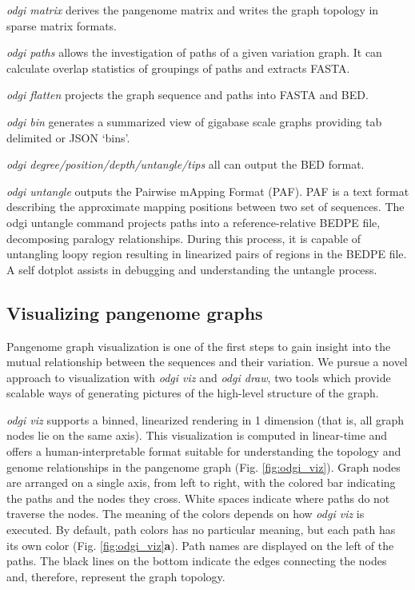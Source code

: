 \documentclass{bioinfo}
\begin{document}
\textit{odgi matrix} derives the pangenome matrix and writes the graph topology in sparse matrix formats.

\textit{odgi paths} allows the investigation of paths of a given variation graph. It can calculate overlap statistics of groupings of paths and extracts FASTA.

\textit{odgi flatten} projects the graph sequence and paths into FASTA and BED.

\textit{odgi bin} generates a summarized view of gigabase scale graphs providing tab delimited or JSON `bins'.

\textit{odgi degree/position/depth/untangle/tips} all can output the BED format.

\textit{odgi untangle} outputs the Pairwise mApping Format (PAF). PAF is a text format describing the approximate mapping positions between two set of sequences.
The odgi untangle command projects paths into a reference-relative BEDPE file, decomposing paralogy relationships.
During this process, it is capable of untangling loopy region resulting in linearized pairs of regions in the BEDPE file. A self dotplot assists in debugging and understanding the untangle process.


\subsection{Visualizing pangenome graphs}
\label{sec:viz}


Pangenome graph visualization is one of the first steps to gain insight into the mutual relationship between the sequences and their variation.
We pursue a novel approach to visualization with \textit{odgi viz} and \textit{odgi draw}, two tools which provide scalable ways of generating pictures of the high-level structure of the graph.

\textit{odgi viz} supports a binned, linearized rendering in 1 dimension (that is, all graph nodes lie on the same axis).
This visualization is computed in linear-time and offers a human-interpretable format suitable for understanding the topology and genome relationships in the pangenome graph (Fig. \ref{fig:odgi_viz}).
Graph nodes are arranged on a single axis, from left to right, with the colored bar indicating the paths and the nodes they cross.
White spaces indicate where paths do not traverse the nodes.
The meaning of the colors depends on how \textit{odgi viz} is executed.
By default, path colors has no particular meaning, but each path has its own color (Fig. \ref{fig:odgi_viz}\textbf{a}).
Path names are displayed on the left of the paths.
The black lines on the bottom indicate the edges connecting the nodes and, therefore, represent the graph topology.
\end{document}

